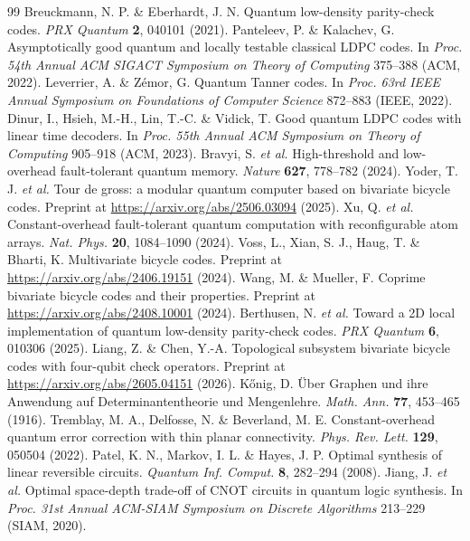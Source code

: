 \documentclass[reprint,twocolumn,superscriptaddress,nofootinbib]{revtex4-2}
\theoremstyle{plain}
\begin{document}
\begin{thebibliography}{99}
 Breuckmann, N. P. \& Eberhardt, J. N. Quantum low-density parity-check codes. \emph{PRX Quantum} \textbf{2}, 040101 (2021).
 Panteleev, P. \& Kalachev, G. Asymptotically good quantum and locally testable classical LDPC codes. In \emph{Proc. 54th Annual ACM SIGACT Symposium on Theory of Computing} 375--388 (ACM, 2022).
 Leverrier, A. \& Z\'emor, G. Quantum Tanner codes. In \emph{Proc. 63rd IEEE Annual Symposium on Foundations of Computer Science} 872--883 (IEEE, 2022).
 Dinur, I., Hsieh, M.-H., Lin, T.-C. \& Vidick, T. Good quantum LDPC codes with linear time decoders. In \emph{Proc. 55th Annual ACM Symposium on Theory of Computing} 905--918 (ACM, 2023).
 Bravyi, S. \emph{et al.} High-threshold and low-overhead fault-tolerant quantum memory. \emph{Nature} \textbf{627}, 778--782 (2024).
 Yoder, T. J. \emph{et al.} Tour de gross: a modular quantum computer based on bivariate bicycle codes. Preprint at \url{https://arxiv.org/abs/2506.03094} (2025).
 Xu, Q. \emph{et al.} Constant-overhead fault-tolerant quantum computation with reconfigurable atom arrays. \emph{Nat. Phys.} \textbf{20}, 1084--1090 (2024).
 Voss, L., Xian, S. J., Haug, T. \& Bharti, K. Multivariate bicycle codes. Preprint at \url{https://arxiv.org/abs/2406.19151} (2024).
 Wang, M. \& Mueller, F. Coprime bivariate bicycle codes and their properties. Preprint at \url{https://arxiv.org/abs/2408.10001} (2024).
 Berthusen, N. \emph{et al.} Toward a 2D local implementation of quantum low-density parity-check codes. \emph{PRX Quantum} \textbf{6}, 010306 (2025).
 Liang, Z. \& Chen, Y.-A. Topological subsystem bivariate bicycle codes with four-qubit check operators. Preprint at \url{https://arxiv.org/abs/2605.04151} (2026).
 K\H{o}nig, D. \"{U}ber Graphen und ihre Anwendung auf Determinantentheorie und Mengenlehre. \emph{Math. Ann.} \textbf{77}, 453--465 (1916).
 Tremblay, M. A., Delfosse, N. \& Beverland, M. E. Constant-overhead quantum error correction with thin planar connectivity. \emph{Phys. Rev. Lett.} \textbf{129}, 050504 (2022).
 Patel, K. N., Markov, I. L. \& Hayes, J. P. Optimal synthesis of linear reversible circuits. \emph{Quantum Inf. Comput.} \textbf{8}, 282--294 (2008).
 Jiang, J. \emph{et al.} Optimal space-depth trade-off of CNOT circuits in quantum logic synthesis. In \emph{Proc. 31st Annual ACM-SIAM Symposium on Discrete Algorithms} 213--229 (SIAM, 2020).

\end{thebibliography}
\end{document}
